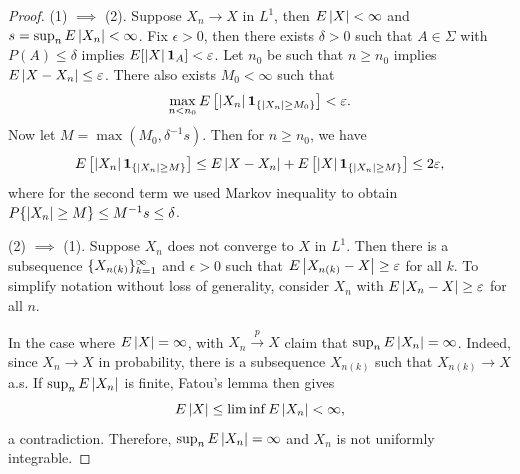 \documentclass[a4paper]{article}
\newcommand{\convp}{\xrightarrow{p}}
\begin{document}
\begin{proof}
  (1) $\implies$ (2). Suppose $X_n \to X$ in $L^1$, then $E \left\lvert X\right\rvert < \infty$
  and $s = \sup_n E \left\lvert X_n\right\rvert < \infty$. Fix $\epsilon > 0$, then 
  there exists $\delta > 0$ such that $A \in \Sigma$
  with $P (A) \leq \delta$ implies $E [\left\lvert X\right\rvert \operatorname{\mathbf{1}}_A] < \varepsilon$.
  Let $n_0$ be such that $n \geq n_0$ implies 
  $E \left\lvert X - X_n\right\rvert \leq \varepsilon$. There also exists $M_0 < \infty$ 
  such that 
  \[
  \max_{n < n_0} E \left[ \left\lvert X_n\right\rvert \operatorname{\mathbf{1}}_{\{\left\lvert X_n\right\rvert \geq M_0 \}} \right]
  < \varepsilon.
  \]
  Now let $M = \max (M_0, \delta^{-1} s)$. Then for $n \geq n_0$, 
  we have 
  \begin{align*}
    E \left[ \left\lvert X_n\right\rvert \operatorname{\mathbf{1}}_{\{\left\lvert X_n\right\rvert \geq M\}} \right] 
    \leq E \left\lvert X - X_n\right\rvert + E \left[ \left\lvert X\right\rvert \operatorname{\mathbf{1}}_{\{\left\lvert X_n\right\rvert \geq M\}} \right]
    \leq 2 \varepsilon,
  \end{align*}
  where for the second term we used Markov inequality 
  to obtain $P \{\left\lvert X_n\right\rvert \geq M\} \leq M^{-1} s \leq \delta$.

  (2) $\implies$ (1). Suppose $X_n$ does not converge to $X$ 
  in $L^1$. Then there is a subsequence $\{ X_{n(k)} \}_{k=1}^\infty$ and 
  $\epsilon > 0$ such that $E \left\lvert X_{n(k)} - X\right\rvert \geq \varepsilon$ for 
  all $k$. To simplify notation without loss of generality,
  consider $X_n$ with $E \left\lvert X_n - X\right\rvert \geq \varepsilon$ for all $n$.

  In the case where $E \left\lvert X\right\rvert = \infty$, with $X_n \convp X$ 
  claim that $\sup_n E \left\lvert X_n\right\rvert = \infty$. Indeed, 
  since $X_n \to X$ in probability, there is a subsequence $X_{n(k)}$
  such that $X_{n(k)} \to X$ a.s. If $\sup_n E \left\lvert X_n\right\rvert$ 
  is finite, Fatou's lemma then gives 
  \[
  E \left\lvert X\right\rvert \leq \liminf E \left\lvert X_n\right\rvert < \infty, 
  \]
  a contradiction. Therefore, $\sup_n E \left\lvert X_n\right\rvert = \infty$
  and $X_n$ is not uniformly integrable.


\end{proof}
\end{document}
